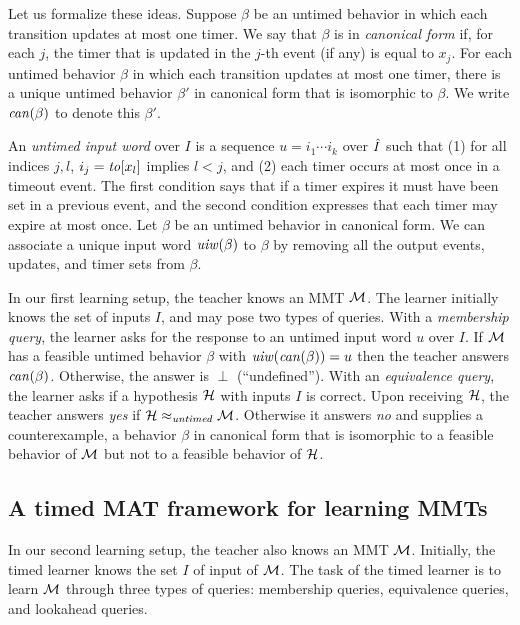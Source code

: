 Let us formalize these ideas.
Suppose $\beta$ be an untimed behavior in which each transition updates at most one timer.
We say that $\beta$ is in \emph{canonical form} if, for each $j$, the timer that is updated in the $j$-th event
(if any) is equal to $x_j$.
For each untimed behavior $\beta$ in which each transition updates at most one timer, there is a unique untimed behavior
$\beta'$ in canonical form that is isomorphic to $\beta$.
We write $\mathit{can}({\beta})$ to denote this $\beta'$.

An \emph{untimed input word} over $I$ is a sequence $u = i_1 \cdots i_k$ over $\hat{I}$ such that (1)
for all indices $j, l$, $i_j = \mathit{to}[x_l]$ implies $l < j$, and (2) each timer occurs at most once in a timeout event.
The first condition  says that if a timer expires it must have been set in a previous event, and the second condition  expresses that
each timer may expire at most once.
Let $\beta$ be an untimed behavior in canonical form.
We can associate a unique input word $\mathit{uiw}(\beta)$ to $\beta$ by removing all the output events,
updates, and timer sets from $\beta$.

In our first learning setup, the teacher knows an MMT ${\cal M}$.
The learner initially knows the set of inputs $I$, and may pose two types of queries.
With a \emph{membership query}, the learner asks for the response to an untimed input word $u$ over $I$.
If ${\cal M}$ has a feasible untimed behavior $\beta$ with $\mathit{uiw}(\mathit{can}({\beta})) = u$ then the teacher answers
$\mathit{can}({\beta})$. Otherwise, the answer is $\perp$ (``undefined'').
With an \emph{equivalence query}, the learner asks if a hypothesis ${\cal H}$ with inputs $I$ is correct.
Upon receiving ${\cal H}$, the teacher answers \emph{yes} if ${\cal H} \approx_{\mathit{untimed}} {\cal M}$.
Otherwise it answers \emph{no} and supplies a counterexample, a behavior $\beta$ in canonical form that
is isomorphic to a feasible behavior of ${\cal M}$ but not to a feasible behavior of ${\cal H}$.

\subsection{A timed MAT framework for learning MMTs}
In our second learning setup, the teacher also knows an MMT ${\cal M}$.
Initially, the timed learner knows the set $I$ of input of ${\cal M}$.
The task of the timed learner is to learn ${\cal M}$ through three types of queries: membership queries, equivalence queries,
and lookahead queries.

